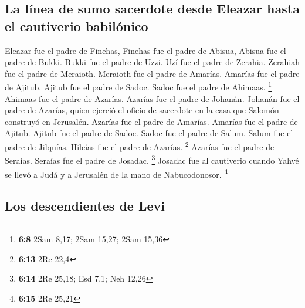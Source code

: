 \begin{paracol}{2}
\hypertarget{la-luxednea-de-sumo-sacerdote-desde-eleazar-hasta-el-cautiverio-babiluxf3nico}{%
\subsection{La línea de sumo sacerdote desde Eleazar hasta el cautiverio
babilónico}\label{la-luxednea-de-sumo-sacerdote-desde-eleazar-hasta-el-cautiverio-babiluxf3nico}}

 Eleazar fue el padre de Finehas, Finehas fue el padre de
Abisua,  Abisua fue el padre de Bukki. Bukki fue el padre
de Uzzi.  Uzí fue el padre de Zerahia. Zerahiah fue el
padre de Meraioth.  Meraioth fue el padre de Amarías.
Amarías fue el padre de Ajitub.  Ajitub fue el padre de
Sadoc. Sadoc fue el padre de Ahimaas. \footnote{\textbf{6:8} 2Sam 8,17;
  2Sam 15,27; 2Sam 15,36}  Ahimaas fue el padre de
Azarías. Azarías fue el padre de Johanán.  Johanán fue el
padre de Azarías, quien ejerció el oficio de sacerdote en la casa que
Salomón construyó en Jerusalén.  Azarías fue el padre de
Amarías. Amarías fue el padre de Ajitub.  Ajitub fue el
padre de Sadoc. Sadoc fue el padre de Salum.  Salum fue
el padre de Jilquías. Hilcías fue el padre de Azarías. \footnote{\textbf{6:13}
  2Re 22,4}  Azarías fue el padre de Seraías. Seraías fue
el padre de Josadac. \footnote{\textbf{6:14} 2Re 25,18; Esd 7,1; Neh
  12,26}  Josadac fue al cautiverio cuando Yahvé se llevó
a Judá y a Jerusalén de la mano de Nabucodonosor. \footnote{\textbf{6:15}
  2Re 25,21}

\hypertarget{los-descendientes-de-levi}{%
\subsection{Los descendientes de Levi}\label{los-descendientes-de-levi}}


\end{paracol}
